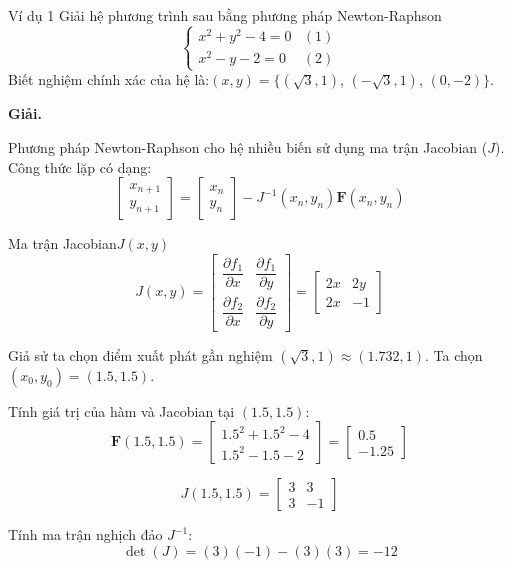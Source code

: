 

\begin{bt}{Ví dụ 1}
Giải hệ phương trình sau bằng phương pháp Newton-Raphson
\[
\begin{cases}
x^2 + y^2 - 4 = 0 & (1) \\
x^2 - y - 2 = 0 & (2)
\end{cases}
\]
Biết nghiệm chính xác của hệ là:$(x,y)=\{(\sqrt{3}, 1)$, $(-\sqrt{3}, 1)$, $(0, -2)\}$.

\end{bt}
{\textbf{Giải.}}

Phương pháp Newton-Raphson cho hệ nhiều biến sử dụng ma trận Jacobian ($J$). Công thức lặp có dạng:
\[
\begin{bmatrix}
x_{n+1} \\
y_{n+1}
\end{bmatrix}
= 
\begin{bmatrix}
x_n \\
y_n
\end{bmatrix}
- J^{-1}(x_n, y_n) \mathbf{F}(x_n, y_n)
\]

Ma trận Jacobian$J(x, y)$
\[
J(x, y) = 
\begin{bmatrix}
\dfrac{\partial f_1}{\partial x} & \dfrac{\partial f_1}{\partial y} \\[10pt]
\dfrac{\partial f_2}{\partial x} & \dfrac{\partial f_2}{\partial y}
\end{bmatrix}
= 
\begin{bmatrix}
2x & 2y \\
2x & -1
\end{bmatrix}
\]

Giả sử ta chọn điểm xuất phát gần nghiệm $(\sqrt{3}, 1) \approx (1.732, 1)$. Ta chọn $(x_0, y_0) = (1.5, 1.5)$.

Tính giá trị của hàm và Jacobian tại $(1.5, 1.5)$:
\[
\mathbf{F}(1.5, 1.5) = 
\begin{bmatrix}
1.5^2 + 1.5^2 - 4 \\
1.5^2 - 1.5 - 2
\end{bmatrix}
= 
\begin{bmatrix}
0.5 \\
-1.25
\end{bmatrix}
\]

\[
J(1.5, 1.5) = 
\begin{bmatrix}
3 & 3 \\
3 & -1
\end{bmatrix}
\]

Tính ma trận nghịch đảo $J^{-1}$:
\[
\det(J) = (3)(-1) - (3)(3) = -12
\]

